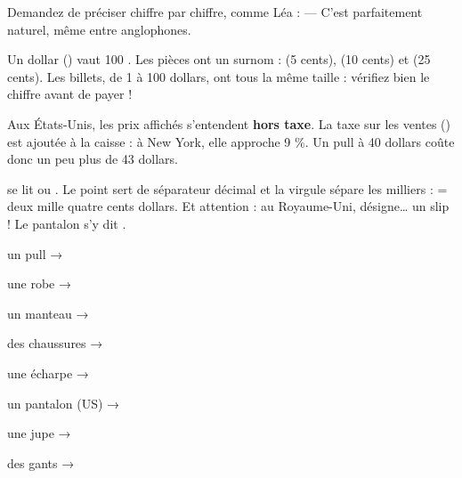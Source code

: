 \begin{astuce}
Demandez de préciser chiffre par chiffre, comme Léa :  —  C'est parfaitement naturel, même entre anglophones.
\end{astuce}


\begin{paire}
\begin{culture}[La monnaie]
Un dollar () vaut 100 . Les pièces ont un surnom :  (5 cents),
 (10 cents) et  (25 cents). Les billets, de 1 à 100 dollars, ont tous la
même taille : vérifiez bien le chiffre avant de payer !
\end{culture}
\begin{culture}
Aux États-Unis, les prix affichés s'entendent \textbf{hors taxe}. La taxe sur les ventes
() est ajoutée à la caisse : à New York, elle approche 9 \%. Un pull à 40 dollars
coûte donc un peu plus de 43 dollars.
\end{culture}
\end{paire}

\begin{culture}
 se lit  ou . Le point
sert de séparateur décimal et la virgule sépare les milliers :  = deux mille quatre
cents dollars. Et attention : au Royaume-Uni,  désigne… un slip ! Le pantalon s'y dit
.
\end{culture}


\begin{questions}[2][french]
\item un pull → 
\item une robe → 
\item un manteau → 
\item des chaussures → 
\item une écharpe → 
\item un pantalon (US) → 
\item une jupe → 
\item des gants → 
\end{questions}

